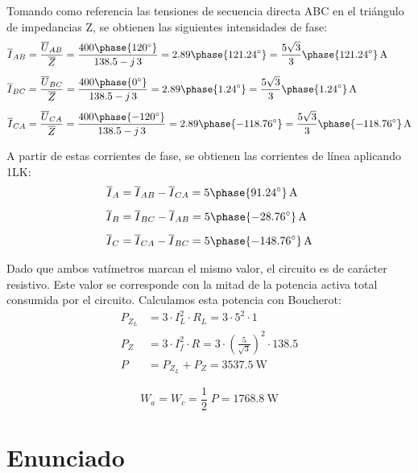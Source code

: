 \vspace{2mm}
Tomando como referencia las tensiones de secuencia directa ABC
en el triángulo de impedancias Z, se obtienen las siguientes
intensidades de fase:
\begin{align*}
  \overline{I}_{AB} &= \frac{\overline{U}_{AB}}{\overline{Z}} = \frac{400\phase{\ang{120}}}{138.5 - j\,3} = {2.89\phase{121.24^\circ}} = {\frac{5 \sqrt3}{3}\phase{121.24^\circ}}\,\unit{\ampere}\\[5pt]
  \overline{I}_{BC} &= \frac{\overline{U}_{BC}}{\overline{Z}} = \frac{400\phase{\ang{0}}}{138.5 - j\,3} = {2.89\phase{1.24^\circ}} = {\frac{5 \sqrt3}{3}\phase{1.24^\circ}}\,\unit{\ampere}\\[5pt]
  \overline{I}_{CA} &= \frac{\overline{U}_{CA}}{\overline{Z}} = \frac{400\phase{\ang{-120}}}{138.5 - j\,3} = {2.89\phase{-118.76^\circ}} = {\frac{5 \sqrt3}{3}\phase{-118.76^\circ}}\,\unit{\ampere}
\end{align*}

A partir de estas corrientes de fase, se obtienen las corrientes de línea aplicando 1LK:
\begin{align*}
  \overline{I}_{A} &= \overline{I}_{AB} - \overline{I}_{CA} = {5\phase{91.24^\circ}}\,\unit{\ampere}\\[5pt]
  \overline{I}_{B} &= \overline{I}_{BC} - \overline{I}_{AB} = {5\phase{-28.76^\circ}}\,\unit{\ampere}\\[5pt]
  \overline{I}_{C} &= \overline{I}_{CA} - \overline{I}_{BC} = {5\phase{-148.76^\circ}}\,\unit{\ampere}
\end{align*}

\vspace{2mm}
Dado que ambos vatímetros marcan el mismo valor, el circuito es
de carácter resistivo. Este valor se corresponde con la mitad de la potencia
activa total consumida por el circuito. Calculamos esta potencia con Boucherot:
\begin{align*}
  P_{Z_L} &= 3 \cdot I_L^2 \cdot R_L = 3 \cdot 5^2 \cdot 1\\[1pt]
  P_Z &= 3 \cdot I_f^2 \cdot R = 3 \cdot \left(\frac{5}{\sqrt3}\right)^2 \cdot 138.5\\[3pt]
  P &= P_{Z_L} + P_{Z} = \SI{3537.5}{\watt}
\end{align*}

\[
  W_a = W_c = \frac{1}{2} \; P = \SI{1768.8}{\watt}
\]



\section{Enunciado}

